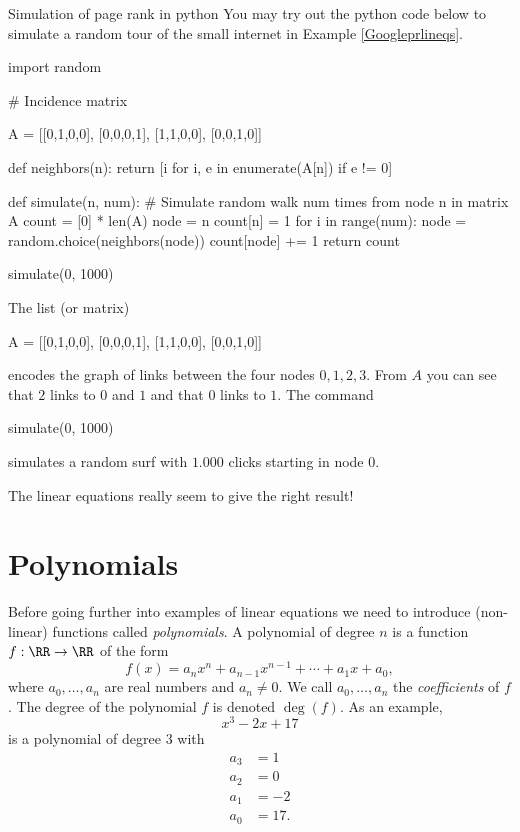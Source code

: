 \documentclass{article}
\begin{document}
\begin{hideinbutton}{Simulation of page rank in python}
You may try out the python code below to simulate a random tour
of the small internet in Example \ref{Googleprlineqs}.

\begin{sage}
import random

# Incidence matrix

A = [[0,1,0,0], [0,0,0,1], [1,1,0,0], [0,0,1,0]]

def neighbors(n):
    return [i for i, e in enumerate(A[n]) if e != 0]

def simulate(n, num): # Simulate random walk num times from node n in matrix A
    count = [0] * len(A)
    node = n
    count[n] = 1
    for i in range(num):
        node = random.choice(neighbors(node))
        count[node] += 1
    return count

simulate(0, 1000)        
\end{sage}

The list (or matrix)
\begin{code}
  A = [[0,1,0,0], [0,0,0,1], [1,1,0,0], [0,0,1,0]]
\end{code}
encodes the graph of links between the four nodes $0, 1, 2, 3$. From
$A$ you can see that $2$ links to $0$ and $1$ and that
$0$ links to $1$. The command

\begin{code}
  simulate(0, 1000)
\end{code}

simulates a random surf with $1.000$ clicks starting in node $0$.

The linear equations really seem to give the right result!
\end{hideinbutton}
  

\section{Polynomials}\label{section:polynomials}

Before going further into examples of linear equations we need to introduce (non-linear)
functions called \emph{polynomials}. A polynomial of degree $n$ is a function $f:\RR\rightarrow \RR$
of the form
\begin{equation}\label{poldef}
f(x) = a_n x^n + a_{n-1} x^{n-1} + \cdots + a_1 x + a_0,
\end{equation}
where $a_0, \dots, a_n$ are real numbers and $a_n\neq 0$. We call $a_0, \dots, a_n$
the \emph{coefficients} of $f$.
The degree of the polynomial $f$ is denoted
$\deg(f)$. As an example,
$$
x^3 - 2 x + 17
$$
is a polynomial of degree $3$ with
\begin{align*}
  a_3 &= 1\\
  a_2 &= 0\\
  a_1 &= -2\\
  a_0 &= 17.
\end{align*}
\end{document}
